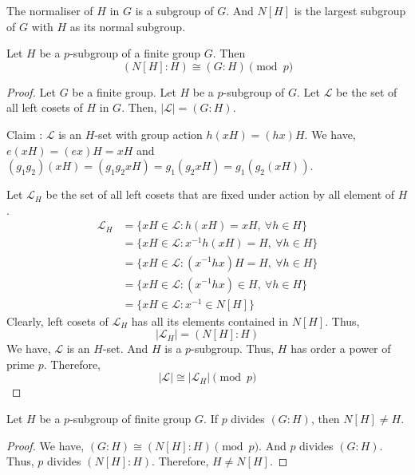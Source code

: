 \begin{remark}
	The normaliser of $H$ in $G$ is a subgroup of $G$.
	And $N[H]$ is the largest subgroup of $G$ with $H$ as its normal subgroup.
\end{remark}
\begin{lemma}
	Let $H$ be a $p$-subgroup of a finite group $G$. Then
	\begin{equation}
		(N[H] : H) \cong (G:H) \pmod{p}
	\end{equation}
\end{lemma}
\begin{proof}
	Let $G$ be a finite group.
	Let $H$ be a $p$-subgroup of $G$.
	Let $\mathscr{L}$ be the set of all left cosets of $H$ in $G$.
	Then, $|\mathscr{L}| = (G:H)$.

	Claim : $\mathscr{L}$ is an $H$-set with group action $h(xH) = (hx)H$.
	We have, $e(xH) = (ex)H = xH$ and $(g_1g_2)(xH) = (g_1g_2xH) = g_1(g_2xH) = g_1(g_2(xH))$.

	Let $\mathscr{L}_H$ be the set of all left cosets that are fixed under action by all element of $H$.
	\begin{align*}
		\mathscr{L}_H & = \{ xH \in \mathscr{L} : h(xH) = xH,\ \forall h \in H\} \\
		& = \{ xH \in \mathscr{L} : x^{-1}h (xH) = H,\ \forall h \in H \} \\
		& = \{ xH \in \mathscr{L} : (x^{-1}hx)H = H,\ \forall h \in H \} \\
		& = \{ xH \in \mathscr{L} : (x^{-1}hx) \in H,\ \forall h \in H \} \\
		& = \{ xH \in \mathscr{L} : x^{-1} \in N[H] \}
	\end{align*}
	Clearly, left cosets of $\mathscr{L}_H$ has all its elements contained in $N[H]$. Thus,
	\begin{equation}
		|\mathscr{L}_H| = (N[H]:H)
	\end{equation}
	We have, $\mathscr{L}$ is an $H$-set.
	And $H$ is a $p$-subgroup.
	Thus, $H$ has order a power of prime $p$.
	Therefore, 
	\begin{equation}
		|\mathscr{L}| \cong |\mathscr{L}_H| \pmod{p}
	\end{equation}
\end{proof}

\begin{corollary}
	Let $H$ be a $p$-subgroup of finite group $G$.
	If $p$ divides $(G:H)$, then $N[H] \ne H$.
\end{corollary}
\begin{proof}
	We have, $(G:H) \cong (N[H]:H) \pmod {p}$.
	And $p$ divides $(G:H)$.
	Thus, $p$ divides $(N[H]:H)$.
	Therefore, $H \ne N[H]$.
\end{proof}

